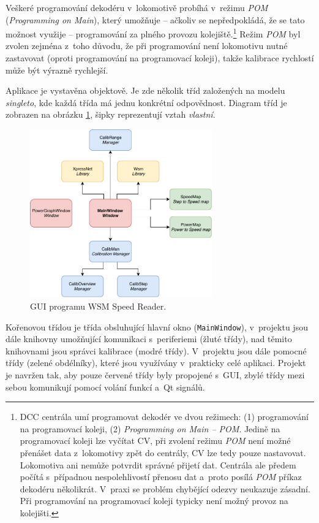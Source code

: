 Veškeré programování dekodéru v~lokomotivě probíhá v~režimu \textit{\gls{POM}}
(\textit{Programming on Main}), který umožňuje -- ačkoliv se nepředpokládá, že
se tato možnost využije -- programování za plného provozu
kolejiště.\footnote{\gls{DCC} centrála umí programovat dekodér ve dvou režimech: (1)
programování na programovací koleji, (2) \textit{Programming on Main -- \gls{POM}}.
Jedině na programovací koleji lze vyčítat \gls{CV}, při zvolení režimu \textit{\gls{POM}}
není možné přenášet data z~lokomotivy zpět do centrály, \gls{CV} lze tedy pouze
nastavovat. Lokomotiva ani nemůže potvrdit správné přijetí dat. Centrála ale
předem počítá s~případnou nespolehlivostí přenosu dat a~proto posílá
\textit{\gls{POM}} příkaz dekodéru několikrát. V~praxi se problém chybějící odezvy
neukazuje zásadní. Při programování na programovací koleji typicky není možný
provoz na kolejišti.} Režim \textit{\gls{POM}} byl zvolen zejména z~toho důvodu, že
při programování není lokomotivu nutné zastavovat (oproti programování na
programovací koleji), takže kalibrace rychlostí může být výrazně rychlejší.

Aplikace je vystavěna objektově. Je zde několik tříd založených na modelu
\textit{singleto}, kde každá třída má jednu konkrétní odpovědnost. Diagram
tříd je zobrazen na obrázku \ref{fig:ac-classes}, šipky reprezentují vztah
\textit{vlastní}.

\begin{figure}[ht]
\includegraphics[width=0.7\textwidth]{data/ac_classes.pdf}
\caption{GUI programu \gls{WSM} Speed Reader.}
\label{fig:ac-classes}
\end{figure}

Kořenovou třídou je třída obsluhující hlavní okno (\texttt{MainWindow}),
v~projektu jsou dále knihovny umožňující komunikaci s~periferiemi (žluté třídy),
nad těmito knihovnami jsou správci kalibrace (modré třídy). V~projektu jsou
dále pomocné třídy (zelené obdélníky), které jsou využívány v~prakticky celé
aplikaci. Projekt je navržen tak, aby pouze červené třídy byly propojené
s~GUI, zbylé třídy mezi sebou komunikují pomocí volání funkcí a~Qt signálů.

